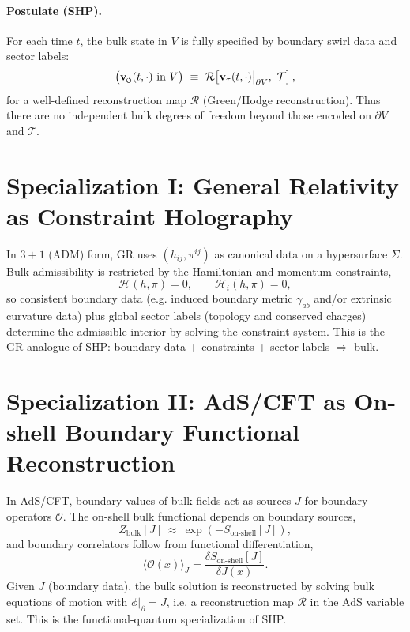 \documentclass[11pt]{article}
\newcommand{\vswirl}{\mathbf{v}_{\mkern-2mu\scriptscriptstyle\boldsymbol{\circlearrowleft}}}
\begin{document}
        \paragraph{Postulate (SHP).}
            For each time $t$, the bulk state in $V$ is fully specified by boundary swirl data and sector labels:
            \begin{equation}
                \big(\vswirl(t,\cdot)\ \text{in}\ V\big)\ \equiv\
                \mathcal{R}\!\left[\mathbf{v}_\tau(t,\cdot)\big|_{\partial V},\ \mathcal{T}\right],
            \end{equation}
            for a well-defined reconstruction map $\mathcal{R}$ (Green/Hodge reconstruction).
            Thus there are no independent bulk degrees of freedom beyond those encoded on $\partial V$ and $\mathcal{T}$.

    \section{Specialization I: General Relativity as Constraint Holography}

    In $3+1$ (ADM) form, GR uses $(h_{ij},\pi^{ij})$ as canonical data on a hypersurface $\Sigma$.
    Bulk admissibility is restricted by the Hamiltonian and momentum constraints,
    \begin{equation}
        \mathcal{H}(h,\pi)=0,\qquad \mathcal{H}_i(h,\pi)=0,
    \end{equation}
    so consistent boundary data (e.g. induced boundary metric $\gamma_{ab}$ and/or extrinsic curvature data) plus global sector labels
    (topology and conserved charges) determine the admissible interior by solving the constraint system.
    This is the GR analogue of SHP: boundary data + constraints + sector labels $\Rightarrow$ bulk.

    \section{Specialization II: AdS/CFT as On-shell Boundary Functional Reconstruction}

    In AdS/CFT, boundary values of bulk fields act as sources $J$ for boundary operators $\mathcal{O}$.
    The on-shell bulk functional depends on boundary sources,
    \begin{equation}
        Z_{\mathrm{bulk}}[J]\ \approx\ \exp\!\left(-S_{\mathrm{on\text{-}shell}}[J]\right),
    \end{equation}
    and boundary correlators follow from functional differentiation,
    \begin{equation}
        \langle \mathcal{O}(x)\rangle_J = \frac{\delta S_{\mathrm{on\text{-}shell}}[J]}{\delta J(x)}.
    \end{equation}
    Given $J$ (boundary data), the bulk solution is reconstructed by solving bulk equations of motion with $\phi|_{\partial}=J$,
    i.e. a reconstruction map $\mathcal{R}$ in the AdS variable set. This is the functional-quantum specialization of SHP.
\end{document}
